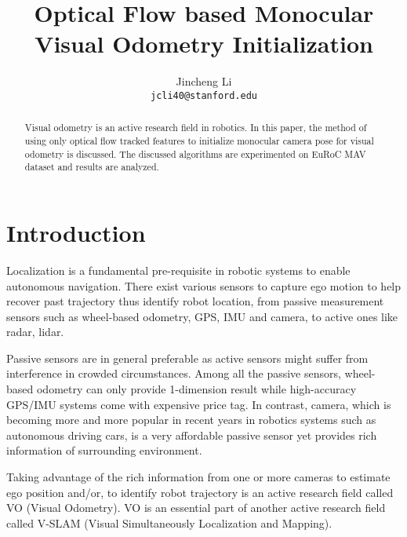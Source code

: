 \documentclass[10pt,twocolumn,letterpaper]{article}
\begin{document}
\title{Optical Flow based Monocular Visual Odometry Initialization}

\author{Jincheng Li\\
{\tt\small jcli40@stanford.edu}
}

\maketitle

\begin{abstract}
   Visual odometry is an active research field in robotics. In this paper, 
   the method of using only optical flow tracked features to initialize monocular camera pose for visual odometry is discussed. The discussed algorithms are 
   experimented on EuRoC MAV dataset and results are analyzed. 
\end{abstract}

\section{Introduction}

Localization is a fundamental pre-requisite in robotic systems to enable autonomous 
navigation. There exist various sensors to capture ego motion to help recover past trajectory thus identify robot location, from passive measurement sensors such as wheel-based odometry, GPS, IMU and camera, to active ones like radar, lidar. 

Passive sensors are in general preferable as active sensors might suffer from interference in crowded circumstances. Among all the passive sensors, wheel-based odometry can only provide 1-dimension result while high-accuracy GPS/IMU systems come with expensive price tag. In contrast, camera, which is becoming more and more popular in recent years in robotics systems such as autonomous driving cars, is a very affordable passive sensor yet provides rich information of surrounding environment. 

Taking advantage of the rich information from one or more cameras to estimate ego position and/or, to identify robot trajectory is an active research field called VO (Visual Odometry). VO is an essential part of another active research field called V-SLAM (Visual Simultaneously Localization and Mapping).
\end{document}
